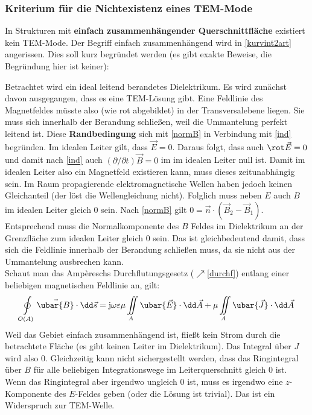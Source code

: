 \subsubsection{Kriterium für die Nichtexistenz eines TEM-Mode}
	In Strukturen mit \textbf{einfach zusammenhängender Querschnittfläche} existiert kein TEM-Mode. Der Begriff einfach zusammenhängend wird in \ref{kurvint2art} angerissen. Dies soll kurz begründet werden (es gibt exakte Beweise, die Begründung hier ist keiner):
	\begin{center}
		
	\end{center}
  Betrachtet wird ein ideal leitend berandetes Dielektrikum. Es wird zunächst davon ausgegangen, dass es eine TEM-Lösung gibt. Eine Feldlinie des Magnetfeldes müsste also (wie rot abgebildet) in der Transversalebene liegen. Sie muss sich innerhalb der Berandung schließen, weil die Ummantelung perfekt leitend ist. Diese \textbf{Randbedingung} sich mit \ref{normB} in Verbindung mit \ref{ind} begründen. Im idealen Leiter gilt, dass $\vec{E}=0$. Daraus folgt, dass auch $\rot\vec{E}=0$ und damit nach \ref{ind} auch $(\partial/\partial t) \vec{B}=0$ im im idealen Leiter null ist. Damit im idealen Leiter also ein Magnetfeld existieren kann, muss dieses zeitunabhängig sein. Im Raum propagierende elektromagnetische Wellen haben jedoch keinen Gleichanteil (der löst die Wellengleichung nicht). Folglich muss neben $E$ auch $B$ im idealen Leiter gleich 0 sein. Nach  \ref{normB} gilt $0=\vec{n}\cdot\left(\vec{B}_2-\vec{B}_1\right)$.
  Entsprechend muss die Normalkomponente des $B$ Feldes im Dielektrikum an der Grenzfläche zum idealen Leiter gleich 0 sein. Das ist gleichbedeutend damit, dass sich die Feldlinie innerhalb der Berandung schließen muss, da sie nicht aus der Ummantelung ausbrechen kann.\\
   Schaut man das Ampèreschs Durchflutungsgesetz ($\nearrow$\ref{durchf}) entlang einer beliebigen magnetischen Feldlinie an, gilt:
		\begin{equation}
			\oint\limits_{O(A)} \vec{\ubar{B}} \cdot \dd\vec{s} = \mathrm{j}\omega\varepsilon\mu \iint\limits_{A} \ubar{\vec{E}}\cdot\dd\vec{A} + \mu\iint\limits_{A} \ubar{\vec{J}}\cdot\dd\vec{A}
		\end{equation}
		Weil das Gebiet einfach zusammenhängend ist, fließt kein Strom durch die betrachtete Fläche (es gibt keinen Leiter im Dielektrikum). Das Integral über $J$ wird also 0. Gleichzeitig kann nicht sichergestellt werden, dass das Ringintegral über $B$ für alle beliebigen Integrationswege im Leiterquerschnitt gleich 0 ist.
		 Wenn das Ringintegral aber irgendwo ungleich 0 ist, muss es irgendwo eine $z$-Komponente des $E$-Feldes geben (oder die Lösung ist trivial). Das ist ein Widerspruch zur TEM-Welle.

